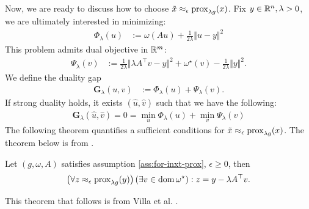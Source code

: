 \documentclass[12pt]{article}
\begin{document}
        Now, we are ready to discuss how to choose $\tilde x \approx_\epsilon \operatorname{prox}_{\lambda g}(x)$. 
        Fix $y \in \mathbb R^n, \lambda > 0$, we are ultimately interested in minimizing: 
        \begin{align}\label{eqn:primal-pp}
            \Phi_\lambda(u) &:= \omega(Au) + \frac{1}{2\lambda} \Vert u - y\Vert^2
        \end{align}
        This problem admits dual objective in $\mathbb R^m$: 
        \begin{align}\label{eqn:dual-pp}
            \Psi_\lambda(v) &:=
            \frac{1}{2\lambda}\Vert \lambda A^\top v - y\Vert^2
            + \omega^\star(v) - \frac{1}{2\lambda}\Vert y\Vert^2. 
        \end{align}
        We define the duality gap
        \begin{align}\label{eqn:duality-gap-pp}
            \mathbf G_\lambda(u, v) &:= \Phi_\lambda(u) + \Psi_\lambda(v). 
        \end{align}
        If strong duality holds, it exists $(\hat u, \hat v)$ such that we have the following: 
        \begin{align*}
            \mathbf G_\lambda(\hat u, \hat v) = 0 = \min_{u} \Phi_\lambda(u) + \min_v \Psi_\lambda(v)
        \end{align*}
        The following theorem quantifies a sufficient conditions for $\tilde x \approx_\epsilon \operatorname{prox}_{\lambda g}(x)$. 
        The theorem below is from \cite[Proposition 2.2]{villa_accelerated_2013}. 
        \begin{theorem}\label{thm:primal-dual-trans}
            Let $(g, \omega, A)$ satisfies assumption \ref{ass:for-inxt-prox}, $\epsilon \ge 0$, then 
            \begin{align*}
                \left(
                    \forall z \approx_\epsilon \operatorname{prox}_{\lambda g}(y) 
                \right)(\exists v \in \operatorname{dom} \omega^\star): z = y - \lambda A^\top v. 
            \end{align*}
        \end{theorem}
        This theorem that follows is from Villa et al. \cite[Proposition 2.3]{villa_accelerated_2013}. 
\end{document}
